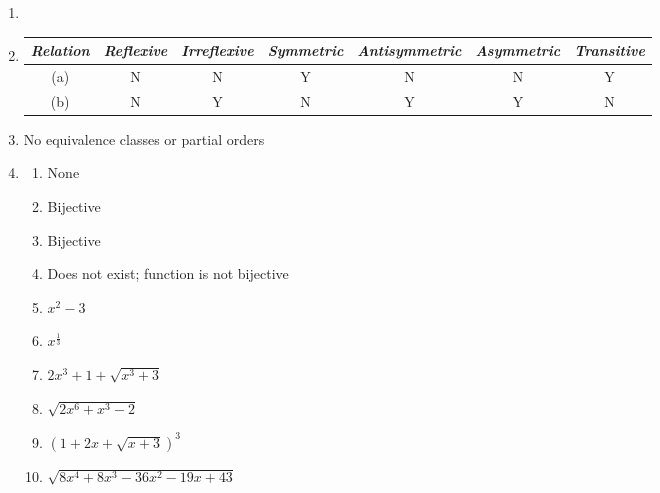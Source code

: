\begin{enumerate}[leftmargin=2cm,labelsep=.5cm,label=\bf\arabic*.]
\item\adm

\item
\begin{tabu}[t]{|c|c|c|c|c|c|c|}
\hline
\textit{Relation} & \textit{Reflexive} & \textit{Irreflexive} & \textit{Symmetric} & \textit{Antisymmetric} & \textit{Asymmetric} & \textit{Transitive} \\ \hline
(a) & N & N & Y & N & N & Y \\ \hline
(b) & N & Y & N & Y & Y & N \\ \hline
\end{tabu}

\item No equivalence classes or partial orders

\item
\begin{enumerate}
\item None
\item Bijective
\item Bijective
\item Does not exist; function is not bijective
\item $x^2-3$
\item $x^{\frac{1}{3}}$
\item $2x^3+1+\sqrt{x^3+3}$
\item $\sqrt{2x^6+x^3-2}$
\item $\left(1+2x+\sqrt{x+3}\right)^3$
\item $\sqrt{8x^4+8x^3-36x^2-19x+43}$
\end{enumerate}
\end{enumerate}

